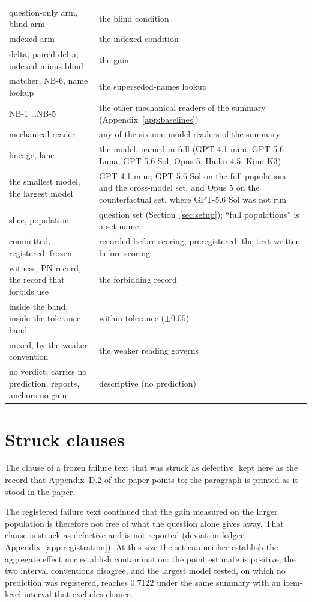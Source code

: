 \documentclass{article}
\begin{document}
\begin{center}
{\begin{minipage}{0.97\linewidth}
\begin{tabular}{@{}p{.26\linewidth}p{.68\linewidth}@{}}
question-only arm, blind arm & the blind condition \\
indexed arm & the indexed condition \\
delta, paired delta, indexed-minus-blind & the gain \\
matcher, NB-6, name lookup & the superseded-names lookup \\
NB-1 \ldots NB-5 & the other mechanical readers of the summary (Appendix~\ref{app:baselines}) \\
mechanical reader & any of the six non-model readers of the summary \\
lineage, lane & the model, named in full (GPT-4.1 mini, GPT-5.6 Luna, GPT-5.6 Sol, Opus 5, Haiku 4.5, Kimi K3) \\
the smallest model, the largest model & GPT-4.1 mini; GPT-5.6 Sol on the full populations and the cross-model set, and Opus 5 on the counterfactual set, where GPT-5.6 Sol was not run \\
slice, population & question set (Section~\ref{sec:setup}); ``full populations'' is a set name \\
committed, registered, frozen & recorded before scoring; preregistered; the text written before scoring \\
witness, PN record, the record that forbids use & the forbidding record \\
inside the band, inside the tolerance band & within tolerance ($\pm0.05$) \\
mixed, by the weaker convention & the weaker reading governs \\
no verdict, carries no prediction, reports, anchors no gain & descriptive (no prediction) \\
\end{tabular}
\end{minipage}}
\end{center}

\section{Struck clauses}\label{sup:struck}

The clause of a frozen failure text that was struck as defective, kept here as the record that Appendix~D.2 of the paper points to; the paragraph is printed as it stood in the paper.

The registered failure text continued that the gain measured on the larger population is therefore not free of what the question alone gives away. That clause is struck as defective and is not reported (deviation ledger, Appendix~\ref{app:registration}). At this size the set can neither establish the aggregate effect nor establish contamination: the point estimate is positive, the two interval conventions disagree, and the largest model tested, on which no prediction was registered, reaches $0.7122$ under the same summary with an item-level interval that excludes chance.
\end{document}
